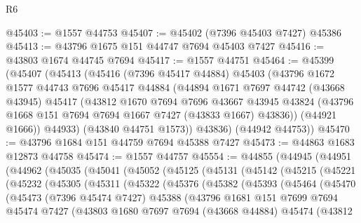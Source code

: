 \begin{lexlean}{R6}
\begin{coremodule}
@45403 := @1557 @44753
@45407 := @45402 (@7396 @45403 @7427) @45386
@45413 := @43796 @1675 @151 @44747 @7694 @45403 @7427
@45416 := @43803 @1674 @44745 @7694
@45417 := @1557 @44751
@45464 := @45399
    (@45407
      (@45413
        (@45416
          (@7396 @45417 @44884)
          @45403
          (@43796
            @1672
            @1577
            @44743
            @7696
            @45417
            @44884
            (@44894
              @1671
              @7697
              @44742
              (@43668 @43945)
              @45417
              (@43812
                @1670
                @7694
                @7696
                @43667
                @43945
                @43824
                (@43796 @1668 @151 @7694 @7694 @1667 @7427 (@43833 @1667) @43836))
              (@44921 @1666))
            @44933)
          (@43840 @44751 @1573))
        @43836)
      (@44942 @44753))
@45470 := @43796 @1684 @151 @44759 @7694 @45388 @7427
@45473 := @44863 @1683 @12873 @44758
@45474 := @1557 @44757
@45554 := @44855
    (@44945
      (@44951
        (@44962
          (@45035
            (@45041
              (@45052
                (@45125
                  (@45131
                    (@45142
                      (@45215
                        (@45221
                          (@45232
                            (@45305
                              (@45311
                                (@45322
                                  (@45376
                                    (@45382
                                      (@45393
                                        (@45464
                                          (@45470
                                            (@45473
                                              (@7396 @45474 @7427)
                                              @45388
                                              (@43796
                                                @1681
                                                @151
                                                @7699
                                                @7694
                                                @45474
                                                @7427
                                                (@43803
                                                  @1680
                                                  @7697
                                                  @7694
                                                  (@43668 @44884)
                                                  @45474
                                                  (@43812

\end{coremodule}
\end{lexlean}
